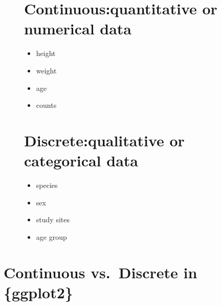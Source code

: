 \documentclass[
  letterpaper,
  DIV=11,
  numbers=noendperiod,
  oneside]{scrreprt}
\providecommand{\tightlist}{%
  \setlength{\itemsep}{0pt}\setlength{\parskip}{0pt}}\usepackage{longtable,booktabs,array}
\begin{document}
\begin{figure}

\begin{minipage}[t]{0.50\linewidth}

{\centering 

\hypertarget{continuous-quantitative-or-numerical-data}{%
\section{\texorpdfstring{Continuous:quantitative or numerical
data}{Continuous: quantitative or numerical data}}\label{continuous-quantitative-or-numerical-data}}

\begin{itemize}
\tightlist
\item
  height
\item
  weight
\item
  age
\item
  counts
\end{itemize}

}

\end{minipage}%
%
\begin{minipage}[t]{0.50\linewidth}

{\centering 

\hypertarget{discrete-qualitative-or-categorical-data}{%
\section{\texorpdfstring{Discrete:qualitative or categorical
data}{Discrete: qualitative or categorical data}}\label{discrete-qualitative-or-categorical-data}}

\begin{itemize}
\tightlist
\item
  species
\item
  sex
\item
  study sites
\item
  age group
\end{itemize}

}

\end{minipage}%

\end{figure}

\hypertarget{continuous-vs.-discrete-in-ggplot2-1}{%
\section{Continuous vs.~Discrete in
\{ggplot2\}}\label{continuous-vs.-discrete-in-ggplot2-1}}
\end{document}
